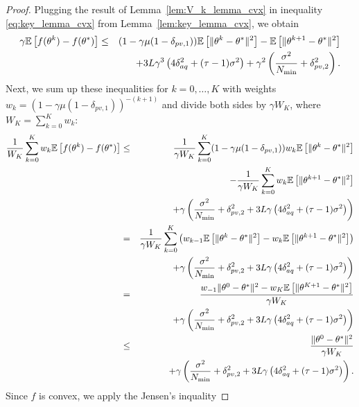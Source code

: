 \begin{proof}
    Plugging the result of Lemma~\ref{lem:V_k_lemma_cvx} in inequality \eqref{eq:key_lemma_cvx} from Lemma~\ref{lem:key_lemma_cvx}, we obtain
    \begin{eqnarray}
        \gamma\mathbb{E}\left[f(\theta^k) - f(\theta^*)\right] &\le& (1-\gamma\mu(1-\delta_{pv,1}))\mathbb{E}\left[\|\theta^k - \theta^*\|^2\right] - \mathbb{E}\left[\|\theta^{k+1} - \theta^*\|^2\right]\notag\\
        &&\quad+ 3L\gamma^3\left(4\delta_{aq}^2 + (\tau-1)\sigma^2\right) + \gamma^2\left(\frac{\sigma^2}{N_{\min}} + \delta_{pv,2}^2\right).\notag
    \end{eqnarray}
    Next, we sum up these inequalities for $k=0,\ldots, K$ with weights $w_k = (1-\gamma\mu(1-\delta_{pv,1}))^{-(k+1)}$ and divide both sides by $\gamma W_K$, where $W_K = \sum_{k=0}^Kw_k$:
    \begin{eqnarray*}
        \frac{1}{W_K}\sum\limits_{k=0}^K w_k\mathbb{E}\left[f(\theta^k) - f(\theta^*)\right] &\le& \frac{1}{\gamma W_K}\sum\limits_{k=0}^K(1-\gamma\mu(1-\delta_{pv,1}))w_k\mathbb{E}\left[\|\theta^k - \theta^*\|^2\right]\notag\\
        &&\quad - \frac{1}{\gamma W_K}\sum\limits_{k=0}^K w_k\mathbb{E}\left[\|\theta^{k+1} - \theta^*\|^2\right]\notag\\
        &&\quad+ \gamma\left(\frac{\sigma^2}{N_{\min}} + \delta_{pv,2}^2 + 3L\gamma\left(4\delta_{aq}^2 + (\tau-1)\sigma^2\right)\right)\\
        &=& \frac{1}{\gamma W_K}\sum\limits_{k=0}^K\left(w_{k-1}\mathbb{E}\left[\|\theta^k - \theta^*\|^2\right] - w_k\mathbb{E}\left[\|\theta^{k+1} - \theta^*\|^2\right]\right)\notag\\
        &&\quad+ \gamma\left(\frac{\sigma^2}{N_{\min}} + \delta_{pv,2}^2 + 3L\gamma\left(4\delta_{aq}^2 + (\tau-1)\sigma^2\right)\right)\\
        &=& \frac{w_{-1}\|\theta^0 - \theta^*\|^2 - w_K\mathbb{E}\left[\|\theta^{K+1}-\theta^*\|^2\right]}{\gamma W_K}\\
        &&\quad+ \gamma\left(\frac{\sigma^2}{N_{\min}} + \delta_{pv,2}^2 + 3L\gamma\left(4\delta_{aq}^2 + (\tau-1)\sigma^2\right)\right)\\
        &\le& \frac{\|\theta^0 - \theta^*\|^2}{\gamma W_K} \\
        &&\quad + \gamma\left(\frac{\sigma^2}{N_{\min}} + \delta_{pv,2}^2 + 3L\gamma\left(4\delta_{aq}^2 + (\tau-1)\sigma^2\right)\right).
    \end{eqnarray*}
    Since $f$ is convex, we apply the Jensen's inquality

\end{proof}

